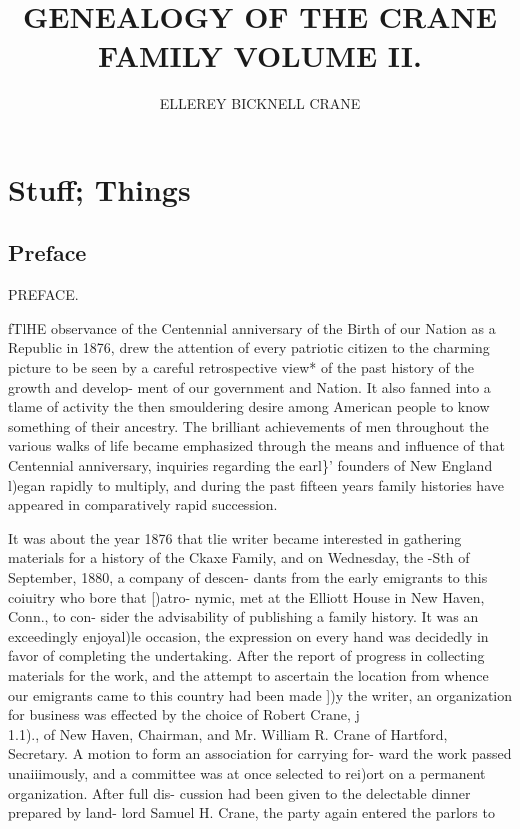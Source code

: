 \documentclass{book}
\begin{document}
\title{GENEALOGY OF THE CRANE FAMILY VOLUME II.}
\author{ELLEREY BICKNELL CRANE}

\maketitle
\tableofcontents

\chapter{Stuff; Things}

\section{Preface}

PREFACE. 

fTlHE observance of the Centennial anniversary of the Birth of 
our Nation as a Republic in 1876, drew the attention of every 
patriotic citizen to the charming picture to be seen by a careful 
retrospective view* of the past history of the growth and develop- 
ment of our government and Nation. It also fanned into a tlame 
of activity the then smouldering desire among American people 
to know something of their ancestry. The brilliant achievements 
of men throughout the various walks of life became emphasized 
through the means and influence of that Centennial anniversary, 
inquiries regarding the earl\}' founders of New England l)egan 
rapidly to multiply, and during the past fifteen years family 
histories have appeared in comparatively rapid succession. 

It was about the year 1876 that tlie writer became interested 
in gathering materials for a history of the Ckaxe Family, and 
on Wednesday, the -Sth of September, 1880, a company of descen- 
dants from the early emigrants to this coiuitry who bore that [)atro- 
nymic, met at the Elliott House in New Haven, Conn., to con- 
sider the advisability of publishing a family history. It was an 
exceedingly enjoyal)le occasion, the expression on every hand was 
decidedly in favor of completing the undertaking. After the 
report of progress in collecting materials for the work, and the 
attempt to ascertain the location from whence our emigrants came 
to this country had been made ])y the writer, an organization for 
business was effected by the choice of Robert Crane, j\\1.1)., of 
New Haven, Chairman, and Mr. William R. Crane of Hartford, 
Secretary. A motion to form an association for carrying for- 
ward the work passed unaiiimously, and a committee was at once 
selected to rei)ort on a permanent organization. After full dis- 
cussion had been given to the delectable dinner prepared by land- 
lord Samuel H. Crane, the party again entered the parlors to 
\end{document}
